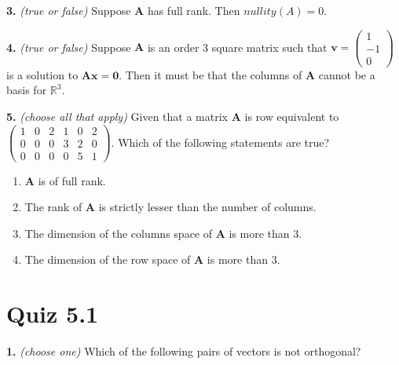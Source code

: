 \documentclass[10pt,a4paper]{article}
\begin{document}
\smallskip
\textbf{3.} \textit{(true or false)} Suppose \(\mathbf{A}\) has full rank. Then \(nullity(A)=0\).

\smallskip
\textbf{4.} \textit{(true or false)} Suppose \(\mathbf{A}\) is an order 3 square matrix such that \(\mathbf{v}=\begin{pmatrix}1\\-1\\0\end{pmatrix}\) is a solution to \(\mathbf{Ax=0}\). Then it must be that the columns of \(\mathbf{A}\) cannot be a basis for \(\mathbb{R}^3\).

\smallskip
\textbf{5.} \textit{(choose all that apply)} Given that a matrix \(\mathbf{A}\) is row equivalent to \(\begin{pmatrix}1&0&2&1&0&2\\0&0&0&3&2&0\\0&0&0&0&5&1\end{pmatrix}\). Which of the following statements are true?

\begin{enumerate}[label=(\Alph*)]
\item \(\mathbf{A}\) is of full rank.
\item The rank of \(\mathbf{A}\) is strictly lesser than the number of columns.
\item The dimension of the columns space of \(\mathbf{A}\) is more than 3.
\item The dimension of the row space of \(\mathbf{A}\) is more than 3.
\end{enumerate}
\smallskip
\section{Quiz 5.1}
\textbf{1.} \textit{(choose one)} Which of the following pairs of vectors is not orthogonal?
\end{document}
